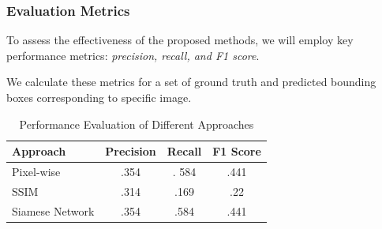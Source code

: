 \documentclass[13.5pt,aspecratio=169, xcolor=dvipsnames]{beamer}
\begin{document}

\begin{frame}
    \onehalfspacing
        \frametitle{ Evaluation Metrics}
       
        \begin{block}{}
            To assess the effectiveness of the proposed methods, we will employ key performance metrics: \textit{precision, recall, and F1 score}. 
        \end{block}

        We calculate these metrics for a set of ground truth and predicted bounding boxes corresponding to specific
        image.

        \begin{table}[htbp]
            \centering
            \caption{Performance Evaluation of Different Approaches}
            \label{tab:performance}
            \begin{tabular}{lccc}
                \toprule
                \textbf{Approach} & \textbf{Precision} & \textbf{Recall} & \textbf{F1 Score} \\
                \midrule
                Pixel-wise & .354 & . 584 & .441 \\
                SSIM & .314 & .169 & .22 \\
                Siamese Network & .354 & .584 & .441 \\
                \bottomrule
            \end{tabular}
        \end{table}
    \end{frame}

\end{document}
